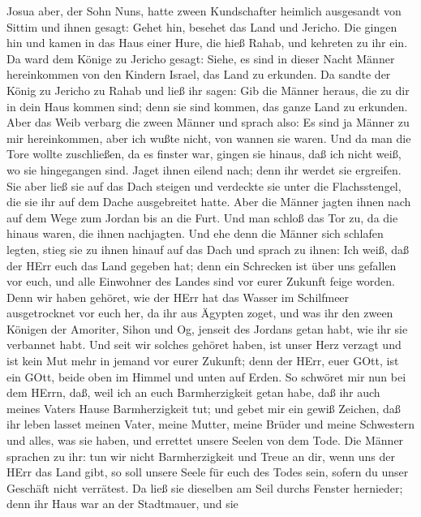  Josua aber, der Sohn Nuns, hatte zween Kundschafter
heimlich ausgesandt von Sittim und ihnen gesagt: Gehet hin, besehet das
Land und Jericho. Die gingen hin und kamen in das Haus einer Hure, die
hieß Rahab, und kehreten zu ihr ein.  Da ward dem Könige zu
Jericho gesagt: Siehe, es sind in dieser Nacht Männer hereinkommen von
den Kindern Israel, das Land zu erkunden.  Da sandte der
König zu Jericho zu Rahab und ließ ihr sagen: Gib die Männer heraus, die
zu dir in dein Haus kommen sind; denn sie sind kommen, das ganze Land zu
erkunden.  Aber das Weib verbarg die zween Männer und sprach
also: Es sind ja Männer zu mir hereinkommen, aber ich wußte nicht, von
wannen sie waren.  Und da man die Tore wollte zuschließen,
da es finster war, gingen sie hinaus, daß ich nicht weiß, wo sie
hingegangen sind. Jaget ihnen eilend nach; denn ihr werdet sie
ergreifen.  Sie aber ließ sie auf das Dach steigen und
verdeckte sie unter die Flachsstengel, die sie ihr auf dem Dache
ausgebreitet hatte.  Aber die Männer jagten ihnen nach auf
dem Wege zum Jordan bis an die Furt. Und man schloß das Tor zu, da die
hinaus waren, die ihnen nachjagten.  Und ehe denn die Männer
sich schlafen legten, stieg sie zu ihnen hinauf auf das Dach
 und sprach zu ihnen: Ich weiß, daß der HErr euch das Land
gegeben hat; denn ein Schrecken ist über uns gefallen vor euch, und alle
Einwohner des Landes sind vor eurer Zukunft feige worden. 
Denn wir haben gehöret, wie der HErr hat das Wasser im Schilfmeer
ausgetrocknet vor euch her, da ihr aus Ägypten zoget, und was ihr den
zween Königen der Amoriter, Sihon und Og, jenseit des Jordans getan
habt, wie ihr sie verbannet habt.  Und seit wir solches
gehöret haben, ist unser Herz verzagt und ist kein Mut mehr in jemand
vor eurer Zukunft; denn der HErr, euer GOtt, ist ein GOtt, beide oben im
Himmel und unten auf Erden.  So schwöret mir nun bei dem
HErrn, daß, weil ich an euch Barmherzigkeit getan habe, daß ihr auch
meines Vaters Hause Barmherzigkeit tut; und gebet mir ein gewiß Zeichen,
 daß ihr leben lasset meinen Vater, meine Mutter, meine
Brüder und meine Schwestern und alles, was sie haben, und errettet
unsere Seelen von dem Tode.  Die Männer sprachen zu ihr:
tun wir nicht Barmherzigkeit und Treue an dir, wenn uns der HErr das
Land gibt, so soll unsere Seele für euch des Todes sein, sofern du unser
Geschäft nicht verrätest.  Da ließ sie dieselben am Seil
durchs Fenster hernieder; denn ihr Haus war an der Stadtmauer, und sie
